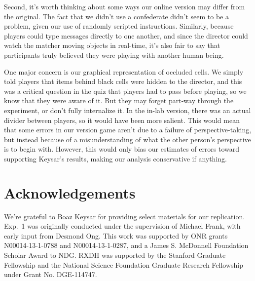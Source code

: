 \documentclass[10pt,letterpaper]{article}
\begin{document}
Second, it's worth thinking about some ways our online version may differ from the original. The fact that we didn't use a confederate didn't seem to be a problem, given our use of randomly scripted instructions. Similarly, because players could type messages directly to one another, and since the director could watch the matcher moving objects in real-time, it's also fair to say that participants truly believed they were playing with another human being. 


One major concern is our graphical representation of occluded cells. We simply told players that items behind black cells were hidden to the director, and this was a critical question in the quiz that players had to pass before playing, so we know that they were aware of it. But they may forget part-way through the experiment, or don't fully internalize it. In the in-lab version, there was an actual divider between players, so it would have been more salient. This would mean that some errors in our version game aren't due to a failure of perspective-taking, but instead because of a misunderstanding of what the other person's perspective is to begin with. However, this would only bias our estimates of errors toward supporting Keysar's results, making our analysis conservative if anything. 


\section{Acknowledgements}

\small We're grateful to Boaz Keysar for providing select materials for our replication. Exp.~1 was originally conducted under the supervision of Michael Frank, with early input from Desmond Ong. This work was supported by ONR grants N00014-13-1-0788 and N00014-13-1-0287,  and a James S. McDonnell Foundation Scholar Award to NDG. RXDH was supported by the Stanford Graduate Fellowship and the National Science Foundation Graduate Research Fellowship under Grant No. DGE-114747. 



\setlength{\bibleftmargin}{.125in}
\setlength{\bibindent}{-\bibleftmargin}


\end{document}
